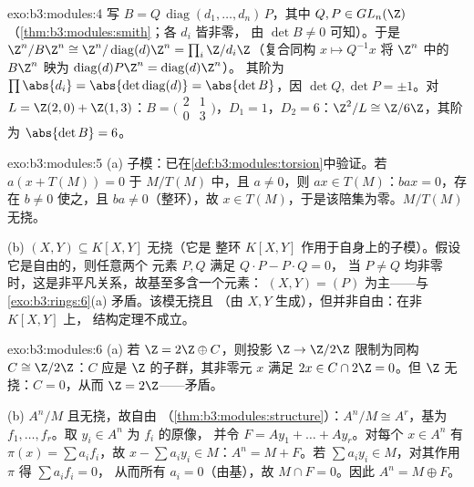 \begin{solution}{exo:b3:modules:4}
写 $B = Q\,\operatorname{diag}(d_1, \dots, d_n)\,P$，其中 $Q, P
\in GL_n(\Z)$（\cref{thm:b3:modules:smith}；各 $d_i$ 皆非零，
由 $\det B \neq 0$ 可知）。于是 $\Z^n/B\Z^n \cong \Z^n/
\operatorname{diag}(d)\Z^n = \prod_i \Z/d_i\Z$（复合同构
$x \mapsto Q^{-1}x$ 将 $\Z^n$ 中的 $B\Z^n$ 映为
$\operatorname{diag}(d)P\Z^n = \operatorname{diag}(d)\Z^n$）。
其阶为 $\prod \abs{d_i} = \abs{\det
\operatorname{diag}(d)} = \abs{\det B}$，因 $\det Q, \det P = \pm
1$。对 $L = \Z(2,0) + \Z(1,3)$：$B = \bigl(\begin{smallmatrix}2
& 1\\ 0 & 3\end{smallmatrix}\bigr)$，$D_1 = 1$，$D_2 = 6$：$\Z^2/L
\cong \Z/6\Z$，其阶为 $\abs{\det B} = 6$。
\end{solution}

\begin{solution}{exo:b3:modules:5}
(a) 子模：已在\cref{def:b3:modules:torsion}中验证。若 $a(x +
T(M)) = 0$ 于 $M/T(M)$ 中，且 $a \neq 0$，则 $ax \in T(M)$：$bax
= 0$，存在 $b \neq 0$ 使之，且 $ba \neq 0$（整环），故 $x \in
T(M)$，于是该陪集为零。$M/T(M)$ 无挠。

(b) $(X, Y) \subseteq K[X,Y]$ 无挠（它是
整环 $K[X,Y]$ 作用于自身上的子模）。假设它是自由的，则任意两个
元素 $P, Q$ 满足 $Q\cdot P - P \cdot Q = 0$，
当 $P \ne Q$ 均非零时，这是非平凡关系，故基至多含一个元素：
$(X, Y) = (P)$ 为主——与
\cref{exo:b3:rings:6}(a) 矛盾。该模无挠且
（由 $X, Y$ 生成），但并非自由：在非 $K[X,Y]$ 上，
结构定理不成立。
\end{solution}

\begin{solution}{exo:b3:modules:6}
(a) 若 $\Z = 2\Z \oplus C$，则投影 $\Z \to \Z/2\Z$
限制为同构 $C \cong \Z/2\Z$：$C$ 应是
$\Z$ 的子群，其非零元 $x$ 满足 $2x \in C
\cap 2\Z = 0$。但 $\Z$ 无挠：$C = 0$，从而 $\Z =
2\Z$——矛盾。

(b) $A^n/M$ 且无挠，故自由
（\cref{thm:b3:modules:structure}）：$A^n/M \cong A^r$，基为
$f_1, \dots, f_r$。取 $y_i \in A^n$ 为 $f_i$ 的原像，
并令 $F = Ay_1 + \dots + Ay_r$。对每个 $x \in A^n$ 有 $\pi(x)
= \sum a_if_i$，故 $x - \sum a_iy_i \in M$：$A^n = M + F$。若
$\sum a_iy_i \in M$，对其作用 $\pi$ 得 $\sum a_if_i = 0$，
从而所有 $a_i = 0$（由基），故 $M \cap F = 0$。因此 $A^n = M \oplus
F$。
\end{solution}

